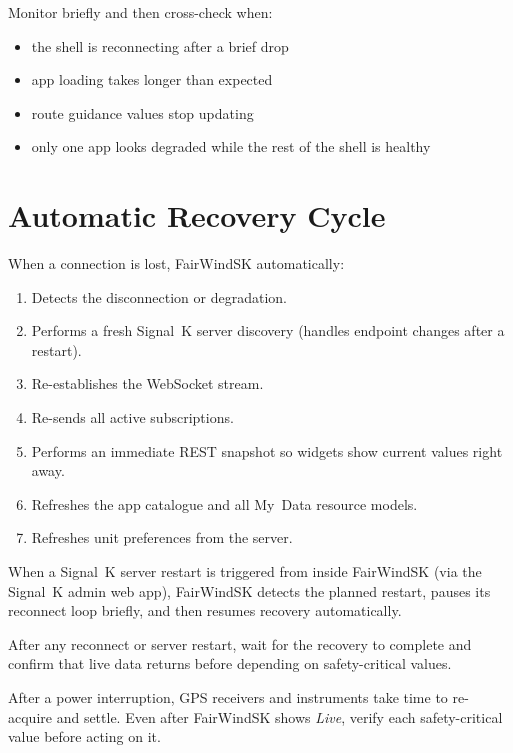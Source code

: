 Monitor briefly and then cross-check when:

\begin{itemize}
  \item the shell is reconnecting after a brief drop
  \item app loading takes longer than expected
  \item route guidance values stop updating
  \item only one app looks degraded while the rest of the shell is healthy
\end{itemize}

\section{Automatic Recovery Cycle}

When a connection is lost, FairWindSK automatically:

\begin{enumerate}
  \item Detects the disconnection or degradation.
  \item Performs a fresh Signal~K server discovery (handles endpoint changes after a restart).
  \item Re-establishes the WebSocket stream.
  \item Re-sends all active subscriptions.
  \item Performs an immediate REST snapshot so widgets show current values right away.
  \item Refreshes the app catalogue and all My~Data resource models.
  \item Refreshes unit preferences from the server.
\end{enumerate}

When a Signal~K server restart is triggered from inside FairWindSK (via the Signal~K
admin web app), FairWindSK detects the planned restart, pauses its reconnect loop
briefly, and then resumes recovery automatically.

After any reconnect or server restart, wait for the recovery to complete and confirm
that live data returns before depending on safety-critical values.

\begin{warningbox}
After a power interruption, GPS receivers and instruments take time to re-acquire and
settle.
Even after FairWindSK shows \textit{Live}, verify each safety-critical value before
acting on it.
\end{warningbox}

